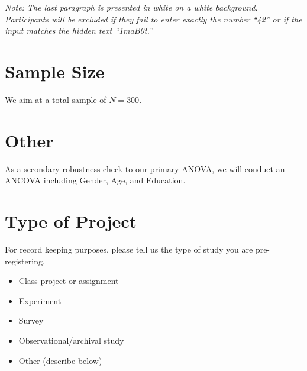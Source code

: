 \documentclass[scrarticle]{scrartcl}
\begin{document}
\vspace{0.75em}
\noindent\textit{Note: The last paragraph is presented in white on a white background.
Participants will be excluded if they fail to enter exactly the number \enquote{42} or if the input matches the hidden text \enquote{1maB0t.}}


\section{Sample Size}
We aim at a total sample of $N = 300$.


\section{Other}
As a secondary robustness check to our primary ANOVA, we will conduct an ANCOVA including Gender, Age, and Education.


\section{Type of Project}
For record keeping purposes, please tell us the type of study you are pre-registering.

\begin{itemize}[label=\Square,noitemsep]
   \item Class project or assignment
   \item[\XBox] Experiment
   \item Survey
   \item Observational/archival study
   \item Other (describe below)
\end{itemize}
\end{document}
